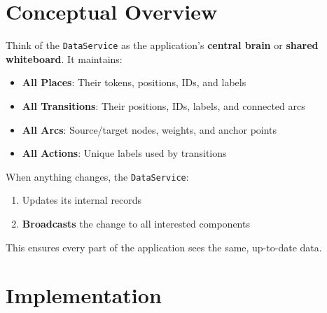 \section{Conceptual Overview}
\label{sec:data-concept}

Think of the \texttt{DataService} as the application's \textbf{central brain} or \textbf{shared whiteboard}. It maintains:

\begin{itemize}
    \item \textbf{All Places}: Their tokens, positions, IDs, and labels
    \item \textbf{All Transitions}: Their positions, IDs, labels, and connected arcs
    \item \textbf{All Arcs}: Source/target nodes, weights, and anchor points
    \item \textbf{All Actions}: Unique labels used by transitions
\end{itemize}

When anything changes, the \texttt{DataService}:
\begin{enumerate}
    \item Updates its internal records
    \item \textbf{Broadcasts} the change to all interested components
\end{enumerate}

This ensures every part of the application sees the same, up-to-date data.

\section{Implementation}
\label{sec:data-implementation}

